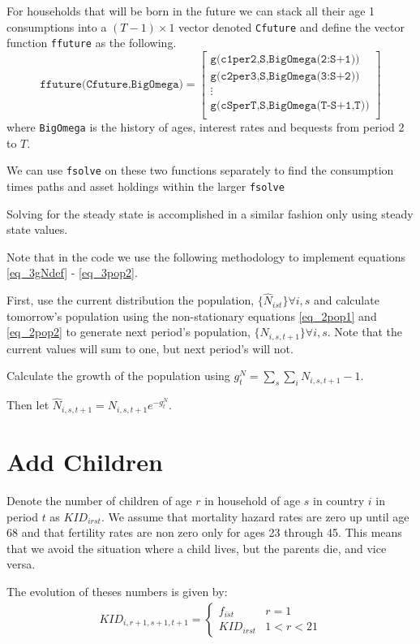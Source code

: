 \documentclass[letterpaper,12pt]{article}
\theoremstyle{definition}
\numberwithin{equation}{section}
\begin{document}
\begin{spacing}{1.5}
	For households that will be born in the future we can stack all their age 1 consumptions into a $(T-1)\times 1$ vector denoted \texttt{Cfuture} and define the vector function \texttt{ffuture} as the following.
	\begin{equation}
		\texttt{ffuture(Cfuture,BigOmega)} = 
		\begin{bmatrix}
		\texttt{g(c1per2,S,BigOmega(2:S+1))} \\
		\texttt{g(c2per3,S,BigOmega(3:S+2))} \\
		\vdots \\
		\texttt{g(cSperT,S,BigOmega(T-S+1,T))} \\
		\end{bmatrix} \nonumber
	\end{equation}
	where \texttt{BigOmega} is the history of ages, interest rates and bequests from period 2 to $T$.

	We can use \texttt{fsolve} on these two functions separately to find the consumption times paths and asset holdings within the larger \texttt{fsolve}

	Solving for the steady state is accomplished in a similar fashion only using steady state values.

	Note that in the code we use the following methodology to implement equations \eqref{eq_3gNdef} - \eqref{eq_3pop2}.

	First, use the current distribution the population, $\{\hat N_{ist}\} \forall i, s$ and calculate tomorrow's population using the non-stationary equations \eqref{eq_2pop1} and \eqref{eq_2pop2} to generate next period's population, $\{N_{i,s,t+1}\} \forall i, s$.  Note that the current values will sum to one, but next period's will not.

	Calculate the growth of the population using $g^N_t = \sum_s \sum_i N_{i,s,t+1} - 1$.

	Then let $\hat N_{i,s,t+1} = N_{i,s,t+1} e^{-g^N_t}$.


\newpage
\section{Add Children}
	Denote the number of children of age $r$ in household of age $s$ in country $i$ in period $t$ as $KID_{irst}$.  We assume that mortality hazard rates are zero up until age 68 and that fertility rates are non zero only for ages 23 through 45.  This means that we avoid the situation where a child lives, but the parents die, and vice versa.

	The evolution of theses numbers is given by:
	\begin{align}
		KID_{i,r+1,s+1,t+1} = \left\{ \begin{matrix} f_{ist} & r=1 \\
		KID_{irst} & 1<r<21\end{matrix} \right. \nonumber
	\end{align}


\end{spacing}
\end{document}
